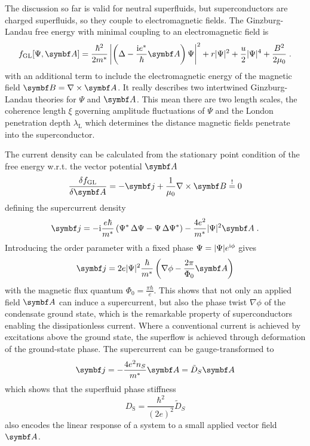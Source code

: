 \documentclass[../notes.tex]{subfiles}
\begin{document}
The discussion so far is valid for neutral superfluids, but superconductors are charged superfluids, so they couple to electromagnetic fields.
The Ginzburg-Landau free energy with minimal coupling to an electromagnetic field is
\begin{equation}
	f_{\mathrm{GL}} [\Psi, \vb{A}] = \frac{\hbar^2}{2 m^*} \left\vert \left( \Delta - \frac{\iu e^*}{\hbar} \vb{A} \right) \Psi \right\vert^2 + r \vert \Psi \vert^2 + \frac{u}{2} \vert \Psi \vert^4 + \frac{B^2}{2 \mu_0}
	\label{eq:GL energy with minimal coupling to EM field} \;.
\end{equation}
with an additional term to include the electromagnetic energy of the magnetic field \(\vb{B} = \nabla \times \vb{A}\).
It really describes two intertwined Ginzburg-Landau theories for \(\Psi\) and \(\vb{A}\).
This mean there are two length scales, the coherence length \(\xi\) governing amplitude fluctuations of \(\Psi\) and the London penetration depth \(\lambda_{\mathrm{L}}\) which determines the distance magnetic fields penetrate into the superconductor.

The current density can be calculated from the stationary point condition of the free energy w.r.t. the vector potential \(\vb{A}\)
\begin{equation}
	\fdv{f_{\mathrm{GL}}}{\vb{A}} = -\vb{j} + \frac{1}{\mu_0} \nabla \times \vb{B} \overset{!}{=} 0
\end{equation}
defining the supercurrent density
\begin{equation}
	\vb{j} = -\iu \frac{e\hbar}{m^*} \left(\Psi^* \adif{\Psi} - \Psi \adif{\Psi^*}\right) - \frac{4 e^2}{m^*} \vert \Psi \vert^2 \vb{A} \;.
	\label{eq:supercurrent density GL theory with phase and vector potential}
\end{equation}
Introducing the order parameter with a fixed phase \(\Psi = \vert \Psi \vert e^{\mathrm{i} \phi}\) gives
\begin{equation}
	\vb{j} = 2 e \vert \Psi \vert^2 \frac{\hbar}{m^*} \left(\nabla \phi - \frac{2 \pi}{\Phi_0} \vb{A} \right)
\end{equation}
with the magnetic flux quantum \(\Phi_0 = \frac{\pi \hbar}{e}\).
This shows that not only an applied field \(\vb{A}\) can induce a supercurrent, but also the phase twist \(\nabla \phi\) of the condensate ground state, which is the remarkable property of superconductors enabling the dissipationless current.
Where a conventional current is achieved by excitations above the ground state, the superflow is achieved through deformation of the ground-state phase.
The supercurrent can be gauge-transformed to
\begin{equation}
	\vb{j} = -\frac{4e^2 n_S}{m^*} \vb{A} = \tilde{D}_S \vb{A}
\end{equation}
which shows that the superfluid phase stiffness
\begin{equation}
	D_{\mathrm{S}} = \frac{\hbar^2}{(2e)^2} \tilde{D}_S
\end{equation}
also encodes the linear response of a system to a small applied vector field \(\vb{A}\).
\end{document}
